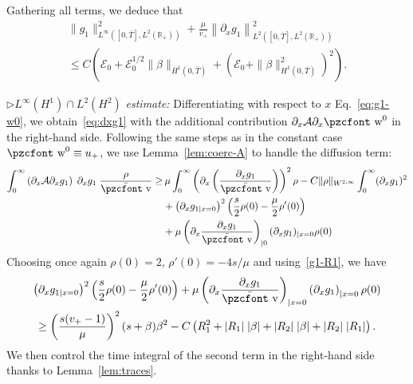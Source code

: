\documentclass[10pt]{amsart}
\theoremstyle{definition}\newtheorem{defi}[theo]{Definition}\newtheorem{rema}[theo]{Remark}\newtheorem{exam}[theo]{Example}\newtheorem{exem}[theo]{Example}\newtheorem{nota}[theo]{Notation}
\newcommand{\mathpzc}[1]{\text{\pzcfont #1}}
\newcommand{\R}{\mathbb{R}}
\newcommand{\p}{\partial}
\newcommand{\bv}{\bar{\mathpzc{v}}}
\newcommand{\cA}{\mathcal A}
\newcommand{\cE}{\mathcal E}
\newcommand{\tw}{\mathpzc{w}}
\begin{document}
Gathering all terms, we deduce that
\begin{multline}\label{borne-g1-L2H1-bis}
 \|g_1\|_{L^\infty\left([0,\overline{T}], L^2(\R_+)\right)}^2 + \frac{\mu}{v_+}\left\|\p_x g_1\right\|_{L^2\left([0,\overline{T}], L^2(\R_+)\right)}^2\\
 \leq C \left(\cE_0+ {\cE_0^{1/2} \|\beta\|_{H^1\left(0, \overline{T}\right)}} + \left(\cE_0 + \|\beta\|_{H^1 \left(0, \overline{T}\right)}^2\right)^2\right).
\end{multline}



$\rhd L^{\infty}(H^1)\cap L^2(H^2)$ \emph{estimate:} Differentiating with respect to $x$ Eq.~\eqref{eq:g1-w0}, we obtain~\eqref{eq:dxg1} with the additional contribution $\partial_x \cA \partial_x \tw^0$ in the right-hand side. Following the same steps as in the constant case $\tw^0 \equiv u_+$, we use Lemma~\ref{lem:coerc-A} to handle the diffusion term:
\begin{align*}
\int_0^\infty \left(\p_x \cA \p_x g_1\right) \;\p_x g_1 \; \frac{\rho}{\bv } \geq&\, \mu \int_0^\infty \left(\p_x \left(\frac{\p_x g_1}{\bv}\right)\right)^2 \rho - C \|\rho\|_{W^{2,\infty}}\int_0^\infty (\p_x g_1)^2\\
&+ \left(\p_x g_{1|x=0}\right)^2 \left(\frac{s}{2} \rho(0)- \frac{\mu}{2}\rho'(0)\right) \\
&+ \mu \left(\partial_x\dfrac{\partial_x g_1}{\bv}\right)_{|0} (\partial_x g_1)_{|x=0} \rho(0)
\end{align*}
Choosing once again $\rho(0)=2$, $\rho'(0)=-4s/\mu$ and using~\eqref{g1-R1}, we have
\begin{multline*}
\left(\p_x g_{1|x=0}\right)^2 \left(\frac{s}{2} \rho(0)- \frac{\mu}{2}\rho'(0)\right) + \mu \left(\partial_x\dfrac{\partial_x g_1}{\bv}\right)_{|x=0} \left(\partial_x g_1\right)_{|x=0} \rho(0)\\
\geq \left(\frac{s(v_+-1)}{\mu}\right)^2(s+\beta) \beta^2 -C\left(R_1^2 + |R_1|\; |\beta| + |R_2|\; |\beta| + |R_2|\; |R_1|\right).
\end{multline*}
We then control the time integral of the second term in the right-hand side thanks to Lemma~\ref{lem:traces}.
\end{document}

